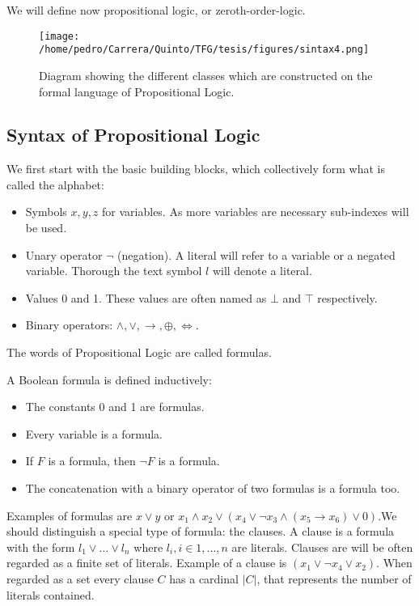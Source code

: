We will define now propositional logic, or zeroth-order-logic.

\begin{figure}[h]
  \begin{center}
    \texttt{[image: /home/pedro/Carrera/Quinto/TFG/tesis/figures/sintax4.png]}
    \caption{Diagram showing the different classes which are constructed on the formal language of Propositional Logic.}
  \end{center}
\end{figure} 


\subsection{Syntax of Propositional Logic}
We first start with the basic building blocks, which collectively form what is called the alphabet:
\begin{itemize}
\item Symbols $x,y,z$ for variables. As more variables are necessary sub-indexes will be used.
\item Unary operator $\neg$ (negation). A literal will refer to a variable or a negated variable. Thorough the text symbol $l$ will denote a literal. 
  
\item Values 0 and 1. These values are often named as $\bot$ and $\top$ respectively.

\item Binary operators: $\wedge, \vee, \rightarrow, \oplus, \iff $.
\end{itemize}


The words of Propositional Logic are called formulas.
\begin{definition}
  A Boolean formula is defined inductively:
  \begin{itemize}
  \item The constants 0 and 1 are formulas.
  \item Every variable is a formula.
  \item If $F$ is a formula, then $\neg  F$ is a formula.
  \item The concatenation with a binary operator of two formulas is a formula too.\\
  \end{itemize}
\end{definition}

Examples of formulas are $x\vee y$ or $x_1\wedge x_2 \vee  ( x_4 \vee \neg  x_3 \wedge (x_5\to x_6) \vee 0 )$.We should distinguish a special type of formula: the clauses. A clause  is a formula with the form $l_1\vee ... \vee l_n$ where $l_i, i \in 1,...,n$ are literals. Clauses are will be often regarded as a finite set of literals. Example of a clause is $(x_1\vee \neg x_4 \vee x_2)$. When regarded as a set every clause $C$ has a cardinal $|C|$, that represents the number of literals contained. \\


